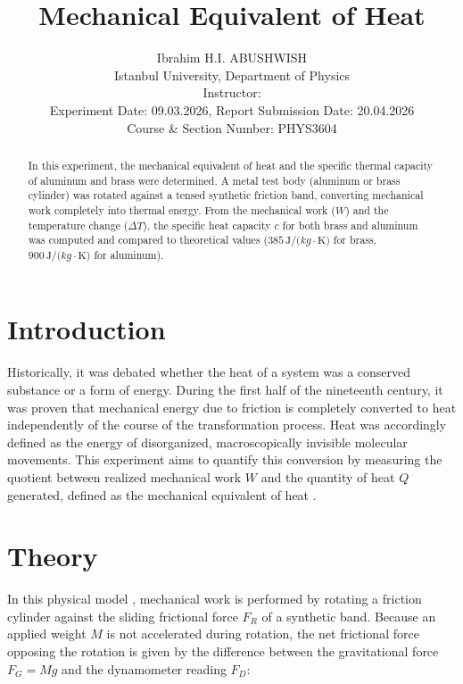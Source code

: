 \documentclass[journal]{IEEEtran}
\begin{document}
\title{Mechanical Equivalent of Heat}
\author{Ibrahim H.I. ABUSHWISH \\
Istanbul University, Department of Physics \\
Instructor:  \\
Experiment Date: 09.03.2026, Report Submission Date: 20.04.2026\\
Course \& Section Number: PHYS3604}


\maketitle

\begin{abstract}
In this experiment, the mechanical equivalent of heat and the specific thermal capacity of aluminum and brass were determined. A metal test body (aluminum or brass cylinder) was rotated against a tensed synthetic friction band, converting mechanical work completely into thermal energy. From the mechanical work ($W$) and the temperature change ($\Delta T$), the specific heat capacity $c$ for both brass and aluminum was computed and compared to theoretical values ($385\,\si{\joule/(kg\cdot\kelvin)}$ for brass, $900\,\si{\joule/(kg\cdot\kelvin)}$ for aluminum).
\end{abstract}

\section{Introduction}
Historically, it was debated whether the heat of a system was a conserved substance or a form of energy. During the first half of the nineteenth century, it was proven that mechanical energy due to friction is completely converted to heat independently of the course of the transformation process. Heat was accordingly defined as the energy of disorganized, macroscopically invisible molecular movements. This experiment aims to quantify this conversion by measuring the quotient between realized mechanical work $W$ and the quantity of heat $Q$ generated, defined as the mechanical equivalent of heat \cite{lab_manual}.

\section{Theory}
In this physical model \cite{lab_manual}, mechanical work is performed by rotating a friction cylinder against the sliding frictional force $F_R$ of a synthetic band. Because an applied weight $M$ is not accelerated during rotation, the net frictional force opposing the rotation is given by the difference between the gravitational force $F_G = Mg$ and the dynamometer reading $F_D$:
\end{document}
